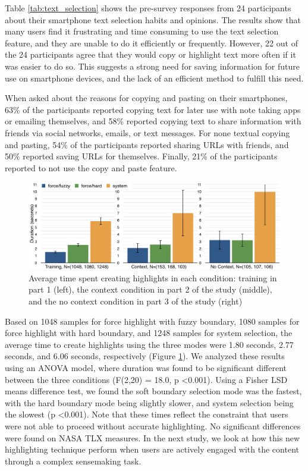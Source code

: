 Table \ref{tab:text_selection} shows the pre-survey responses from 24 participants about their smartphone text selection habits and opinions. The results show that many users find it frustrating and time consuming to use the text selection feature, and they are unable to do it efficiently or frequently. However, 22 out of the 24 participants agree that they would copy or highlight text more often if it was easier to do so. This suggests a strong need for saving information for future use on smartphone devices, and the lack of an efficient method to fulfill this need. 

When asked about the reasons for copying and pasting on their smartphones, 63\% of the participants reported copying text for later use with note taking apps or emailing themselves, and 58\% reported copying text to share information with friends via social networks, emails, or text messages. For none textual copying and pasting, 54\% of the participants reported sharing URLs with friends, and 50\% reported saving URLs for themselves. Finally, 21\% of the participants reported to not use the copy and paste feature. 


\begin{figure}
    \centering
    \includegraphics[width=\columnwidth]{Chapters/Highlight/img/runtime.png}
    \caption[Average time spent creating highlights under different conditions.]{Average time spent creating highlights in each condition: training in part 1 (left), the context condition in part 2 of the study (middle), and the no context condition in part 3 of the study (right)}
    \label{fig:highlight_runtime}
\end{figure}

Based on 1048 samples for force highlight with fuzzy boundary, 1080 samples for force highlight with hard boundary, and 1248 samples for system selection, the average time to create highlights using the three modes were 1.80 seconds, 2.77 seconds, and 6.06 seconds, respectively (Figure \ref{fig:highlight_runtime}). We analyzed these results using an ANOVA model, where duration was found to be significant different between the three conditions (F(2,20) = 18.0, p \textless  0.001). Using a Fisher LSD means difference test, we found the soft boundary selection mode was the fastest, with the hard boundary mode being slightly slower, and system selection being the slowest (p \textless 0.001). Note that these times reflect the constraint that users were not able to proceed without accurate highlighting. No significant differences were found on NASA TLX measures. In the next study, we look at how this new highlighting technique perform when users are actively engaged with the content through a complex sensemaking task. 


